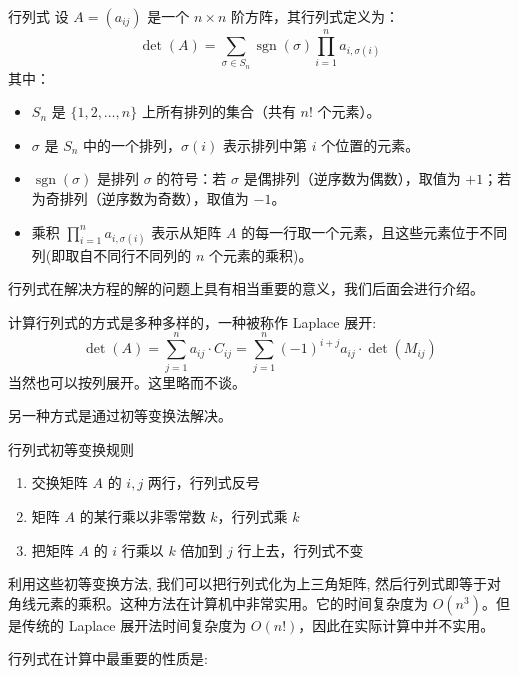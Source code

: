 \documentclass[a4paper,12pt]{ctexart}
\begin{document}
    \begin{mydef}{行列式}{}
        设 $A = (a_{ij})$ 是一个 $n \times n$ 阶方阵，其行列式定义为：
        \[
        \det(A) = \sum_{\sigma \in S_n} \operatorname{sgn}(\sigma) \prod_{i=1}^n a_{i,\sigma(i)}
        \]
        其中：
        \begin{itemize}
            \item $S_n$ 是 $\{1, 2, \dots, n\}$ 上所有排列的集合（共有 $n!$ 个元素）。
            \item $\sigma$ 是 $S_n$ 中的一个排列，$\sigma(i)$ 表示排列中第 $i$ 个位置的元素。
            \item $\operatorname{sgn}(\sigma)$ 是排列 $\sigma$ 的符号：若 $\sigma$ 是偶排列（逆序数为偶数），取值为 $+1$；若为奇排列（逆序数为奇数），取值为 $-1$。
            \item 乘积 $\prod_{i=1}^n a_{i,\sigma(i)}$ 表示从矩阵 $A$ 的每一行取一个元素，且这些元素位于不同列(即取自不同行不同列的 $n$ 个元素的乘积)。
        \end{itemize}
    \end{mydef}
        
        行列式在解决方程的解的问题上具有相当重要的意义，我们后面会进行介绍。
        
        计算行列式的方式是多种多样的，一种被称作 Laplace 展开:
        \[
        \det(A) = \sum_{j=1}^{n} a_{ij} \cdot C_{ij} = \sum_{j=1}^{n} (-1)^{i+j} a_{ij} \cdot \det(M_{ij})
        \]
        当然也可以按列展开。这里略而不谈。
        
        另一种方式是通过初等变换法解决。
        
        \begin{myprop}{行列式初等变换规则}{}
        \begin{enumerate}
            \item 交换矩阵 $A$ 的 $i,j$ 两行，行列式反号
            \item 矩阵 $A$ 的某行乘以非零常数 $k$，行列式乘 $k$
            \item 把矩阵 $A$ 的 $i$ 行乘以 $k$ 倍加到 $j$ 行上去，行列式不变
        \end{enumerate}
        \end{myprop}

利用这些初等变换方法, 我们可以把行列式化为上三角矩阵, 然后行列式即等于对角线元素的乘积。这种方法在计算机中非常实用。它的时间复杂度为 $O(n^3)$。但是传统的 Laplace 展开法时间复杂度为 $O(n!)$，因此在实际计算中并不实用。

行列式在计算中最重要的性质是:
\end{document}
